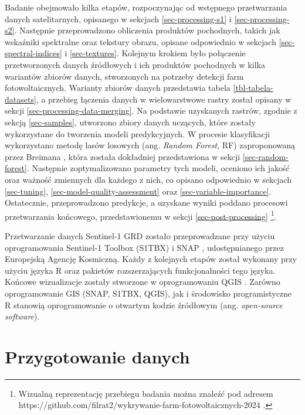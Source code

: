 \documentclass{amuthesis}
\begin{document}
Badanie obejmowało kilka etapów, rozpoczynając od wstępnego
przetwarzania danych satelitarnych, opisanego w sekcjach
\ref{sec-processing-s1} i \ref{sec-processing-s2}. Następnie
przeprowadzono obliczenia produktów pochodnych, takich jak wskaźniki
spektralne oraz tekstury obrazu, opisane odpowiednio w sekcjach
\ref{sec-spectral-indices} i \ref{sec-textures}. Kolejnym krokiem było
połączenie przetworzonych danych źródłowych i ich produktów pochodnych w
kilka wariantów zbiorów danych, stworzonych na potrzeby detekcji farm
fotowoltaicznych. Warianty zbiorów danych przedstawia tabela
\ref{tbl-tabela-datasets}, a przebieg łączenia danych w wielowarstwowe
rastry został opisany w sekcji \ref{sec-processing-data-merging}. Na
podstawie uzyskanych rastrów, zgodnie z sekcją \ref{sec-samples},
utworzono zbiory danych uczących, które zostały wykorzystane do
tworzenia modeli predykcyjnych. W procesie klasyfikacji wykorzystano
metodę lasów losowych (ang. \emph{Random Forest}, RF) zaproponowaną
przez Breimana \autocite*{breiman_2001_rf}, która została dokładniej
przedstawiona w sekcji \ref{sec-random-forest}. Następnie
zoptymalizowano parametry tych modeli, oceniono ich jakość oraz ważność
zmiennych dla każdego z nich, co opisano odpowiednio w sekcjach
\ref{sec-tuning}, \ref{sec-model-quality-assessment} oraz
\ref{sec-variable-importance}. Ostatecznie, przeprowadzono predykcje, a
uzyskane wyniki poddano procesowi przetwarzania końcowego,
przedstawionemu w sekcji \ref{sec-post-processing} \footnote{Wizualną
  reprezentację przebiegu badania można znaleźć pod adresem
  https://github.com/filrat2/wykrywanie-farm-fotowoltaicznych-2024 .}.

Przetwarzanie danych Sentinel-1 GRD zostało przeprowadzane przy użyciu
oprogramowania Sentinel-1 Toolbox (S1TBX) \autocite{s1tbx} i SNAP
\autocite{snap}, udostępnianego przez Europejską Agencję Kosmiczną.
Każdy z kolejnych etapów został wykonany przy użyciu języka R
\autocite{R-base} oraz pakietów rozszerzających funkcjonalności tego
języka. Końcowe wizualizacje zostały stworzone w oprogramowaniu QGIS
\autocite{qgis}. Zarówno oprogramowanie GIS (SNAP, S1TBX, QGIS), jak i
środowisko programistyczne R stanowią oprogramowanie o otwartym kodzie
źródłowym (ang. \emph{open-source software}).

\hypertarget{sec-processing}{%
\section{Przygotowanie danych}\label{sec-processing}}
\end{document}
